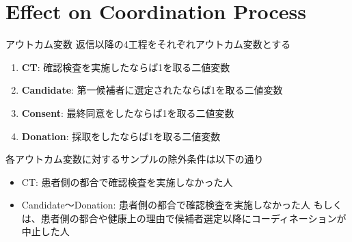 \documentclass[
      aspectratio=169,
        12pt,
    ]{beamer}
\renewcommand{\textbf}[1]{{\color{DarkBlue}\bfseries#1}}
\providecommand{\tightlist}{%
  \setlength{\itemsep}{0pt}\setlength{\parskip}{0pt}}
\begin{document}
\hypertarget{effect-on-coordination-process}{%
\section{Effect on Coordination Process}\label{effect-on-coordination-process}}

\begin{frame}{アウトカム変数}
\protect\hypertarget{ux30a2ux30a6ux30c8ux30abux30e0ux5909ux6570-1}{}
返信以降の4工程をそれぞれアウトカム変数とする

\begin{enumerate}
\tightlist
\item
  \textbf{CT}: 確認検査を実施したならば1を取る二値変数
\item
  \textbf{Candidate}: 第一候補者に選定されたならば1を取る二値変数
\item
  \textbf{Consent}: 最終同意をしたならば1を取る二値変数
\item
  \textbf{Donation}: 採取をしたならば1を取る二値変数
\end{enumerate}

各アウトカム変数に対するサンプルの除外条件は以下の通り

\begin{itemize}
\tightlist
\item
  CT: 患者側の都合で確認検査を実施しなかった人
\item
  Candidate～Donation: 患者側の都合で確認検査を実施しなかった人
  もしくは、患者側の都合や健康上の理由で候補者選定以降にコーディネーションが中止した人
\end{itemize}
\end{frame}
\end{document}
